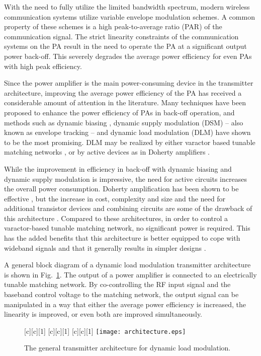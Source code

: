 \documentclass[10pt,journal]{IEEEtran}
\begin{document}
With the need to fully utilize the limited bandwidth spectrum, modern wireless communication systems utilize variable envelope modulation schemes. A common property of these schemes is a high peak-to-average ratio (PAR) of the communication signal. The strict linearity constraints of the communication systems on the PA result in the need to operate the PA at a significant output power back-off. This severely degrades the average power efficiency for even PAs with high peak efficiency.

Since the power amplifier is the main power-consuming device in the transmitter architecture, improving the average power efficiency of the PA has received a considerable amount of attention in the literature. Many techniques have been proposed to enhance the power efficiency of PAs in back-off operation, and methods such as dynamic biasing \cite{yang}, dynamic supply modulation (DSM) \cite{wang} -- also known as envelope tracking -- and dynamic load modulation (DLM) \cite{raab} have shown to be the most promising. DLM may be realized by either varactor based tunable matching networks \cite{fuMTT,hosseinMTT}, or by active devices as in Doherty amplifiers \cite{doherty,cripps}.

While the improvement in efficiency in back-off with dynamic biasing and dynamic supply modulation is impressive, the need for active circuits increases the overall power consumption. Doherty amplification has been shown to be effective \cite{pelk}, but the increase in cost, complexity and size and the need for additional transistor devices and combining circuits are some of the drawback of this architecture \cite{fuMTT}. Compared to these architectures, in order to control a varactor-based tunable matching network, no significant power is required. This has the added benefits that this architecture is better equipped to cope with wideband signals and that it generally results in simpler designs \cite{raab}.

A general block diagram of a dynamic load modulation transmitter architecture is shown in Fig.~\ref{architecture}. The output of a power amplifier is connected to an electrically tunable matching network. By co-controlling the RF input signal  and the baseband control voltage  to the matching network, the output signal  can be manipulated in a way that either the average power efficiency is increased, the linearity is improved, or even both are improved simultaneously.

\begin{figure}[t]
\centering {}[c][c][1]{} [c][c][1]{}
[c][c][1]{}
\texttt{[image: architecture.eps]}
\caption{The general transmitter architecture for dynamic load modulation.}
\label{architecture}
\end{figure}
\end{document}
